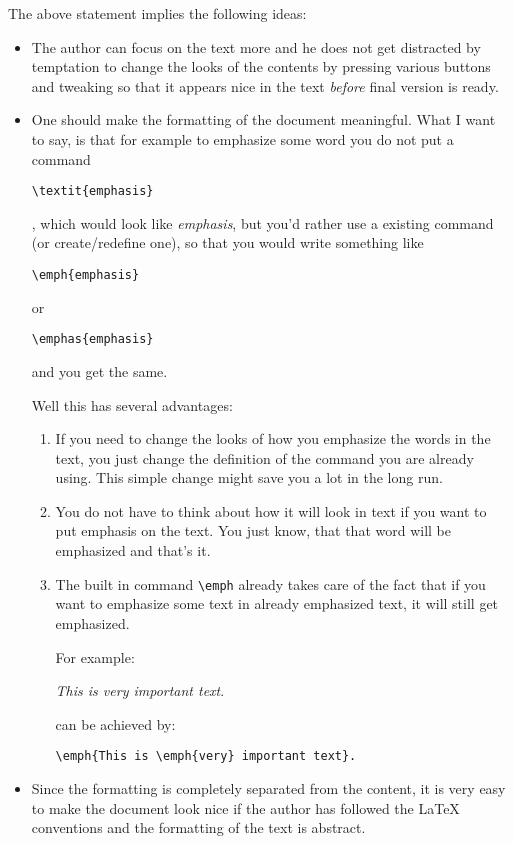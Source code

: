 \documentclass[
    draft
    ]{scrartcl}
\begin{document}
%
The above statement implies the following ideas:
\begin{itemize}
    \item The author can focus on the text more and he does not get distracted
        by temptation to change the looks of the contents by pressing various
        buttons and tweaking so that it appears nice in the text \emph{before}
        final version is ready.

    \item One should make the formatting of the document meaningful. What I want
        to say, is that for example to emphasize some word you do not put a
        command 
\begin{lstlisting}
\textit{emphasis}
\end{lstlisting}
        , which would look like
        \emph{emphasis}, but you'd rather use a existing command (or
        create/redefine one), so that you would write something like
\begin{lstlisting}
\emph{emphasis}
\end{lstlisting}
        or 
\begin{lstlisting}
\emphas{emphasis}
\end{lstlisting}
        and you get the same.

        Well this has several advantages:
        \begin{enumerate}
            \item If you need to change the looks of how you emphasize the words
                in the text, you just change the definition of the command you
                are already using.
                This simple change might save you a lot in the long run.

            \item You do not have to think about how it will look in text if you
                want to put emphasis on the text.
                You just know, that that word will be emphasized and that's it.

            \item The built in command \verb|\emph| already takes care of the
                fact that if you want to emphasize some text in already
                emphasized text, it will still get emphasized.
                
                For example:
                
                \emph{This is \emph{very} important text}.
                
                can be achieved by:
\begin{lstlisting}
\emph{This is \emph{very} important text}.
\end{lstlisting}
        \end{enumerate}
    \item Since the formatting is completely separated from the content, it is
        very easy to make the document look nice if the author has followed the
        \LaTeX{} conventions and the formatting of the text is abstract.

\end{itemize}
\end{document}
